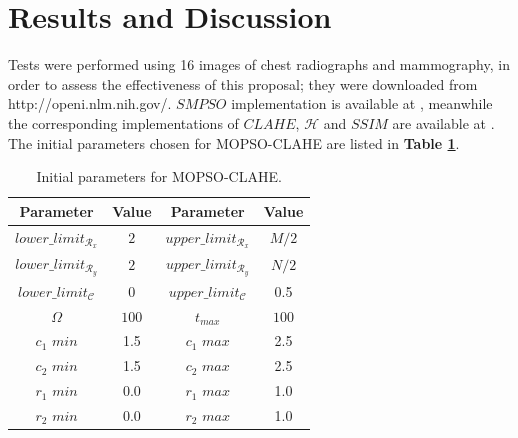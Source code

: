 \documentclass[spanish,twocolumn]{article}
\begin{document}
{\section{Results and Discussion}
\label{sec:resultadosdiscusion}

 Tests were performed using 16 images of chest radiographs and mammography, in order to assess the effectiveness of this proposal; they were downloaded from http://openi.nlm.nih.gov/. $SMPSO$ implementation is available at \cite{5586354}, meanwhile the corresponding implementations of $CLAHE$, $\mathscr{H}$ and $SSIM$ are available at \cite{opencv_library}. The initial parameters chosen for MOPSO-CLAHE are listed in \textbf{Table \ref{table:parametrospso}}.


\begin{table}[h]
\caption[Parámetros de entrada para $MOPSO$]{Initial parameters for MOPSO-CLAHE.}
\begin{center}
 \begin{tabular}{||c c | c c||} 
 \hline
 Parameter & Value & Parameter & Value \\ [0.5ex] 
 \hline\hline
 $lower\_limit_{\mathscr{R}_x}$ & $2$ & $upper\_limit_{\mathscr{R}_x}$ & $M/2$ \\ 
 \hline
 $lower\_limit_{\mathscr{R}_y}$ & $2$ & $upper\_limit_{\mathscr{R}_y}$ & $N/2$ \\  
 \hline
 $lower\_limit_{{\mathscr{C}}}$ & $0$ & $upper\_limit_{{\mathscr{C}}}$ & 0.5 \\
\hline
$\Omega$ & $100$ & $t_{max}$ & $100$ \\ 
\hline
$c_1$ $min$ & 1.5 & $c_1$ $max$ & 2.5 \\ 
\hline
$c_2$ $min$ & 1.5 & $c_2$ $max$ & 2.5 \\ 
\hline
$r_1$ $min$ & 0.0 & $r_1$ $max$ & 1.0 \\ 
\hline
$r_2$ $min$ & 0.0 & $r_2$ $max$ & 1.0 \\
\hline
\end{tabular}
\end{center}
\label{table:parametrospso}
\end{table}

}
\end{document}
